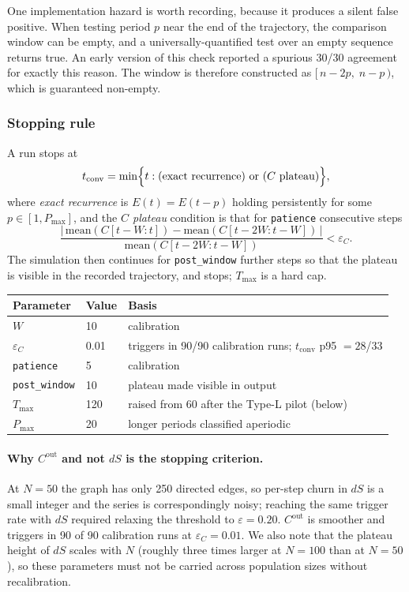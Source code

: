 One implementation hazard is worth recording, because it produces a silent false
positive. When testing period $p$ near the end of the trajectory, the comparison window
can be empty, and a universally-quantified test over an empty sequence returns true. An
early version of this check reported a spurious 30/30 agreement for exactly this reason.
The window is therefore constructed as $[\,n - 2p,\; n - p\,)$, which is guaranteed
non-empty.

\subsubsection{Stopping rule}
\label{sec:stopping}

A run stops at
\[
t_{\mathrm{conv}} = \min\Bigl\{ t : \text{(exact recurrence) or (}C\text{ plateau)} \Bigr\},
\]
where \emph{exact recurrence} is $E(t) = E(t-p)$ holding persistently for some
$p \in [1, P_{\max}]$, and the \emph{$C$ plateau} condition is that for
\texttt{patience} consecutive steps
\[
\frac{\bigl|\,\mathrm{mean}(C[t{-}W{:}t]) - \mathrm{mean}(C[t{-}2W{:}t{-}W])\,\bigr|}
     {\mathrm{mean}(C[t{-}2W{:}t{-}W])} < \varepsilon_C .
\]
The simulation then continues for \texttt{post\_window} further steps so that the
plateau is visible in the recorded trajectory, and stops; $T_{\max}$ is a hard cap.

\begin{center}
\begin{tabular}{lll}
\toprule
Parameter & Value & Basis \\
\midrule
$W$                  & 10   & calibration \\
$\varepsilon_C$      & 0.01 & triggers in 90/90 calibration runs; $t_{\mathrm{conv}}$ p95 $= 28$/$33$ \\
\texttt{patience}    & 5    & calibration \\
\texttt{post\_window}& 10   & plateau made visible in output \\
$T_{\max}$           & 120  & raised from 60 after the Type-L pilot (below) \\
$P_{\max}$           & 20   & longer periods classified aperiodic \\
\bottomrule
\end{tabular}
\end{center}

\paragraph{Why $C^{\mathrm{out}}$ and not $dS$ is the stopping criterion.}
At $N = 50$ the graph has only 250 directed edges, so per-step churn in $dS$ is a small
integer and the series is correspondingly noisy; reaching the same trigger rate with
$dS$ required relaxing the threshold to $\varepsilon = 0.20$. $C^{\mathrm{out}}$ is
smoother and triggers in 90 of 90 calibration runs at $\varepsilon_C = 0.01$. We also
note that the plateau height of $dS$ scales with $N$ (roughly three times larger at
$N = 100$ than at $N = 50$), so these parameters must not be carried across population
sizes without recalibration.

